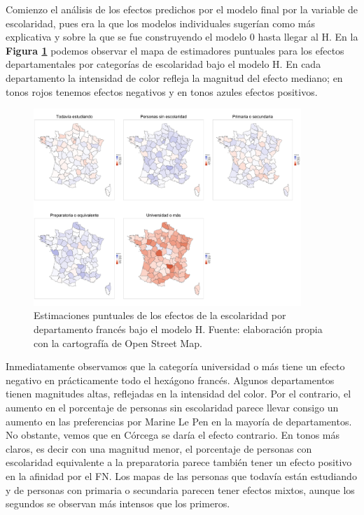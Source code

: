 Comienzo el análisis de los efectos predichos por el modelo final por la variable de escolaridad, pues era la que los modelos individuales sugerían como más explicativa y sobre la que se fue construyendo el modelo 0 hasta llegar al H. En la \textbf{Figura \ref{fig:Mapa_Efectos_Escolaridad}} podemos observar el mapa de estimadores puntuales para los efectos departamentales por categorías de escolaridad bajo el modelo H. En cada departamento la intensidad de color refleja la magnitud del efecto mediano; en tonos rojos tenemos efectos negativos y en tonos azules efectos positivos.\\

\begin{figure}[h]
	\centering
	\includegraphics[width = 0.9\textwidth]{Figs/Efectos/Mapa_Efectos_Escolaridad_Modelo_H}
	\caption{Estimaciones puntuales de los efectos de la escolaridad por departamento francés bajo el modelo H. Fuente: elaboración propia con la cartografía de Open Street Map.}
	\label{fig:Mapa_Efectos_Escolaridad}
\end{figure}

Inmediatamente observamos que la categoría universidad o más tiene un efecto negativo en prácticamente todo el hexágono francés. Algunos departamentos tienen magnitudes altas, reflejadas en la intensidad del color. Por el contrario, el aumento en el porcentaje de personas sin escolaridad parece llevar consigo un aumento en las preferencias por Marine Le Pen en la mayoría de departamentos. No obstante, vemos que en Córcega se daría el efecto contrario. En tonos más claros, es decir con una magnitud menor, el porcentaje de personas con escolaridad equivalente a la preparatoria parece también tener un efecto positivo en la afinidad por el FN. Los mapas de las personas que todavía están estudiando y de personas con primaria o secundaria parecen tener efectos mixtos, aunque los segundos se observan más intensos que los primeros.\\

